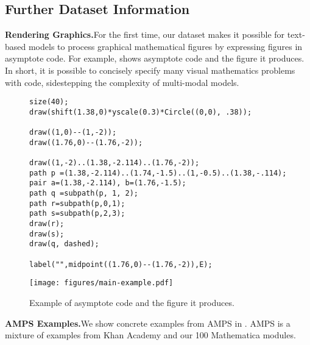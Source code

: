\documentclass{article}
\begin{document}
\subsection{Further Dataset Information}\label{app:further_data_info}



\noindent\textbf{Rendering Graphics.}\quad For the first time, our dataset makes it possible for text-based models to process graphical mathematical figures by expressing figures in asymptote code. For example,  shows asymptote code and the figure it produces. In short, it is possible to concisely specify many visual mathematics problems with code, sidestepping the complexity of multi-modal models. 

\begin{figure*}
    \centering
    \begin{verbatim}
size(40);
draw(shift(1.38,0)*yscale(0.3)*Circle((0,0), .38));

draw((1,0)--(1,-2));
draw((1.76,0)--(1.76,-2));

draw((1,-2)..(1.38,-2.114)..(1.76,-2));
path p =(1.38,-2.114)..(1.74,-1.5)..(1,-0.5)..(1.38,-.114);
pair a=(1.38,-2.114), b=(1.76,-1.5);
path q =subpath(p, 1, 2);
path r=subpath(p,0,1);
path s=subpath(p,2,3);
draw(r);
draw(s);
draw(q, dashed);

label("",midpoint((1.76,0)--(1.76,-2)),E);
    \end{verbatim}
\texttt{[image: figures/main-example.pdf]}
    
    
    
\caption{Example of asymptote code and the figure it produces.}
    \label{fig:asy}
\end{figure*}


\noindent\textbf{AMPS Examples.}\quad We show concrete examples from AMPS in . AMPS is a mixture of examples from Khan Academy and our 100 Mathematica modules.
\end{document}
